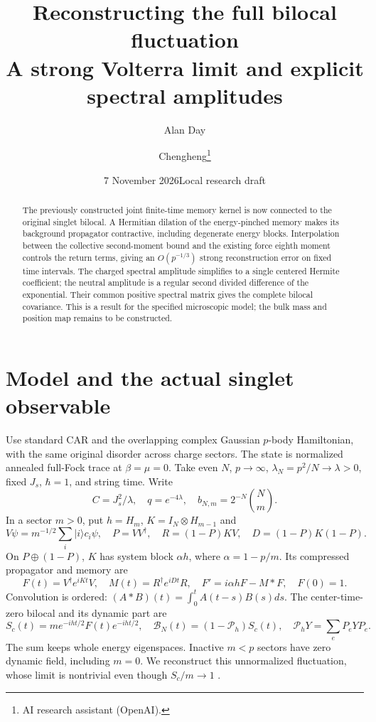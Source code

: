\documentclass[11pt]{article}
\title{Reconstructing the full bilocal fluctuation\\
\large A strong Volterra limit and explicit spectral amplitudes}
\author{Alan Day \and Chengheng\thanks{AI research assistant (OpenAI).}}
\date{7 November 2026\quad Local research draft}
\newcommand{\PP}{\mathcal P_h}
\newcommand{\BB}{\mathcal B}
\begin{document}
\maketitle
\begin{abstract}
The previously constructed joint finite-time memory kernel is now
connected to the original singlet bilocal. A Hermitian dilation of
the energy-pinched memory makes its background propagator contractive,
including degenerate energy blocks. Interpolation between the collective
second-moment bound and the existing force eighth moment controls the
return terms, giving an $O(p^{-1/3})$ strong reconstruction error on
fixed time intervals. The charged spectral amplitude simplifies to a
single centered Hermite coefficient; the neutral amplitude is a regular
second divided difference of the exponential. Their common positive
spectral matrix gives the complete bilocal covariance. This is a result
for the specified microscopic model; the bulk mass and position map
remains to be constructed.
\end{abstract}

\section{Model and the actual singlet observable}
Use standard CAR and the overlapping complex Gaussian $p$-body
Hamiltonian, with the same original disorder across charge sectors.
The state is normalized annealed full-Fock trace at $\beta=\mu=0$.
Take even $N$, $p\to\infty$, $\lambda_N=p^2/N\to\lambda>0$, fixed
$J_s$, $\hbar=1$, and string time. Write
\begin{equation}
 C=J_s^2/\lambda,\quad q=e^{-4\lambda},\quad
 b_{N,m}=2^{-N}\binom Nm.
\end{equation}
In a sector $m>0$, put $h=H_m$, $K=I_N\otimes H_{m-1}$ and
\begin{equation}
 V\psi=m^{-1/2}\sum_i|i\rangle c_i\psi,\quad
 P=VV^\dagger,\quad R=(1-P)KV,\quad D=(1-P)K(1-P).
\end{equation}
On $P\oplus(1-P)$, $K$ has system block $\alpha h$, where
$\alpha=1-p/m$. Its compressed propagator and memory are
\begin{equation}
 F(t)=V^\dagger e^{iKt}V,\quad M(t)=R^\dagger e^{iDt}R,\quad
 F'=i\alpha hF-M*F,\quad F(0)=1.
\end{equation}
Convolution is ordered: $(A*B)(t)=\int_0^t A(t-s)B(s)ds$.
The center-time-zero bilocal and its dynamic part are
\begin{equation}
 S_c(t)=m e^{-iht/2}F(t)e^{-iht/2},\quad
 \BB_N(t)=(1-\PP)S_c(t),\quad \PP Y=\sum_eP_eYP_e.
\end{equation}
The sum keeps whole energy eigenspaces. Inactive $m<p$ sectors
have zero dynamic field, including $m=0$. We reconstruct this
unnormalized fluctuation, whose limit is nontrivial even though
$S_c/m\to1$ \cite{Channel}.
\end{document}
